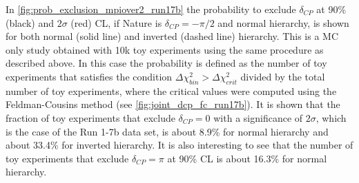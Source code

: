 %


In \cref{fig:prob_exclusion_mpiover2_run17b} 
the probability to exclude $\delta_{CP}$ at 90\% (black) and $2\sigma$ (red) CL, 
if Nature is $\delta_{CP}=-\pi/2$ and normal hierarchy, is shown
for both normal (solid line) and inverted (dashed line) hierarchy.
This is a MC only study obtained with 10k toy experiments using
the same procedure as described above.
In this case the probability is defined as the number of toy experiments
that satisfies the condition $\Delta \chi^2_{bin} > \Delta \chi^2_{crit}$
divided by the total number of toy experiments,
where the critical values were computed using the Feldman-Cousins method
(see \cref{fig:joint_dcp_fc_run17b}).
It is shown that the fraction of toy experiments that exclude $\delta_{CP}=0$
with a significance of $2\sigma$,
which is the case of the Run 1-7b data set,  
is about 8.9\%
for normal hierarchy and about 33.4\% for inverted hierarchy.
It is also interesting to see that the 
number of toy experiments that exclude $\delta_{CP} = \pi$
at 90\% CL is about 16.3\% for normal hierarchy.


